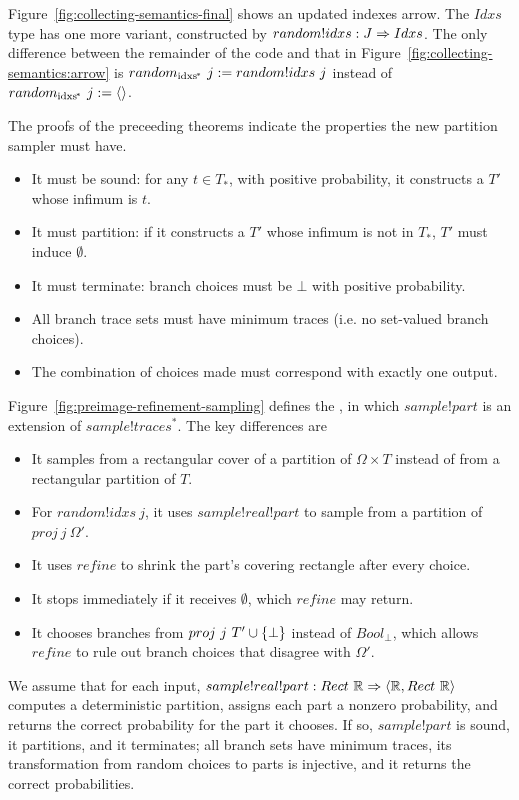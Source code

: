 Figure~\ref{fig:collecting-semantics-final} shows an updated indexes arrow.
The $Idxs$ type has one more variant, constructed by $random!idxs : J \Rightarrow Idxs$.
The only difference between the remainder of the code and that in Figure~\ref{fig:collecting-semantics:arrow} is $random_\mathrm{idxs^{\mspace{-2mu}*}}~j := random!idxs~j$ instead of $random_\mathrm{idxs^{\mspace{-2mu}*}}~j := \langle{}\rangle$.

The proofs of the preceeding theorems indicate the properties the new partition sampler must have.
\begin{itemize}
	\item It must be sound: for any $t \in T_*$, with positive probability, it constructs a $T'$ whose infimum is $t$.
	\item It must partition: if it constructs a $T'$ whose infimum is not in $T_*$, $T'$ must induce $\emptyset$.
	\item It must terminate: branch choices must be $\bot$ with positive probability.
	\item All branch trace sets must have minimum traces (i.e. no set-valued branch choices).
	\item The combination of choices made must correspond with exactly one output.
\end{itemize}

Figure~\ref{fig:preimage-refinement-sampling} defines the , in which $sample!part$ is an extension of $sample!traces^*$.
The key differences are
\begin{itemize}
	\item It samples from a rectangular cover of a partition of $\Omega \times T$ instead of from a rectangular partition of $T$.
	\item For $random!idxs~j$, it uses $sample!real!part$ to sample from a partition of $proj~j~\Omega'$.
	\item It uses $refine$ to shrink the part's covering rectangle after every choice.
	\item It stops immediately if it receives $\emptyset$, which $refine$ may return.
	\item It chooses branches from $proj~j~T' \cup \{{\bot}\}$ instead of $Bool_\bot$, which allows $refine$ to rule out branch choices that disagree with $\Omega'$.
\end{itemize}
We assume that for each input, $sample!real!part : Rect~\mathbb{R} \Rightarrow \langle{\mathbb{R}, Rect~\mathbb{R}}\rangle$ computes a deterministic partition, assigns each part a nonzero probability, and returns the correct probability for the part it chooses.
If so, $sample!part$ is sound, it partitions, and it terminates; all branch sets have minimum traces, its transformation from random choices to parts is injective, and it returns the correct probabilities.

